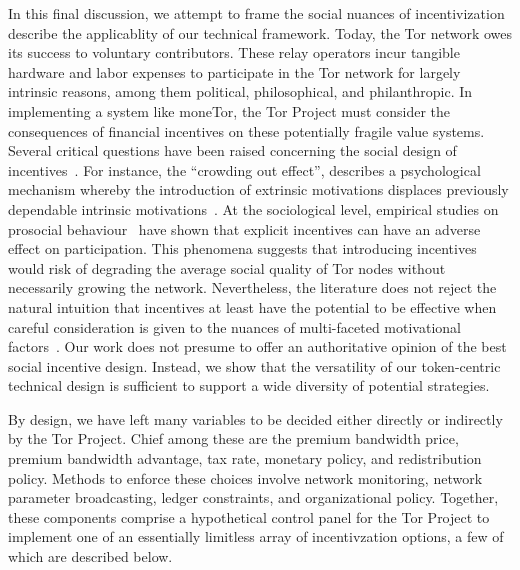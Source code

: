 

In this final discussion, we attempt to frame the social nuances of
incentivization describe the applicablity of our technical framework. Today, the
Tor network owes its success to voluntary contributors. These relay operators
incur tangible hardware and labor expenses to participate in the Tor network for
largely intrinsic reasons, among them political, philosophical, and
philanthropic. In implementing a system like moneTor, the Tor Project must
consider the consequences of financial incentives on these potentially
fragile value systems. Several critical questions have been raised concerning
the social design of incentives~\cite{jansenblogpost}. For instance, the
``crowding out effect'', describes a psychological mechanism whereby the
introduction of extrinsic motivations displaces previously dependable intrinsic
motivations~\cite{10.1257/jep.25.4.191}. At the sociological level, empirical
studies on prosocial behaviour~\cite{10.1257/aer.96.5.1652} have shown that
explicit incentives can have an adverse effect on participation. This phenomena
suggests that introducing incentives would risk of degrading the average social
quality of Tor nodes without necessarily growing the network. Nevertheless, the
literature does not reject the natural intuition that incentives at least have
the potential to be effective when careful consideration is given to the nuances
of multi-faceted motivational factors~\cite{10.1257/aer.96.5.1652}. Our work
does not presume to offer an authoritative opinion of the best social incentive
design. Instead, we show that the versatility of our token-centric technical
design is sufficient to support a wide diversity of potential strategies.

By design, we have left many variables to be decided either directly or
indirectly by the Tor Project. Chief among these are the premium bandwidth
price, premium bandwidth advantage, tax rate, monetary policy, and
redistribution policy. Methods to enforce these choices involve network
monitoring, network parameter broadcasting, ledger constraints, and
organizational policy. Together, these components comprise a hypothetical
control panel for the Tor Project to implement one of an essentially limitless
array of incentivzation options, a few of which are described below.

